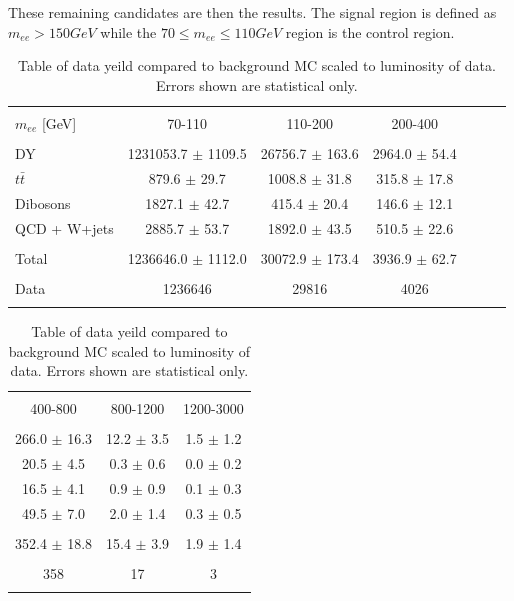 These remaining candidates are then the results. The signal region is defined as $m_{ee} > 150 GeV$ while the $70 \leq m_{ee} \leq 110 GeV$ region is the control region.


\begin{table}[h!]
\centering %
\begin{tabular}{l cccccc} %
\hline\hline \\[-2ex] %
$m_{ee}$ [GeV] & 70-110 & 110-200 & 200-400 \\  [0.2ex]
\hline  \\[-2ex] %
DY & 1231053.7 $\pm$ 1109.5 & 26756.7 $\pm$ 163.6 & 2964.0 $\pm$ 54.4 \\ 
$t\bar{t}$ & 879.6 $\pm$ 29.7 & 1008.8 $\pm$ 31.8 & 315.8 $\pm$ 17.8 \\ 
Dibosons & 1827.1 $\pm$ 42.7 & 415.4 $\pm$ 20.4 & 146.6 $\pm$ 12.1 \\ 
QCD + W+jets & 2885.7 $\pm$ 53.7 & 1892.0 $\pm$ 43.5 & 510.5 $\pm$ 22.6 \\ [0.2ex]
\hline  \\[-2ex] %
Total & 1236646.0 $\pm$ 1112.0 & 30072.9 $\pm$ 173.4 & 3936.9 $\pm$ 62.7 \\ [0.2ex]
\hline  \\[-2ex] %
Data & 1236646 & 29816 & 4026 \\ [0.2ex]
\hline\hline  \\ %
\end{tabular}
\begin{tabular}{ccc} %
\hline\hline \\[-2ex] %
400-800 & 800-1200 & 1200-3000 \\  [0.2ex]
\hline  \\[-2ex] %
266.0 $\pm$ 16.3 & 12.2 $\pm$ 3.5 & 1.5 $\pm$ 1.2 \\ 
20.5 $\pm$ 4.5 & 0.3 $\pm$ 0.6 & 0.0 $\pm$ 0.2 \\ 
16.5 $\pm$ 4.1 & 0.9 $\pm$ 0.9 & 0.1 $\pm$ 0.3 \\ 
49.5 $\pm$ 7.0 & 2.0 $\pm$ 1.4 & 0.3 $\pm$ 0.5 \\ [0.2ex]
\hline  \\[-2ex] %
352.4 $\pm$ 18.8 & 15.4 $\pm$ 3.9 & 1.9 $\pm$ 1.4 \\ [0.2ex]
\hline  \\[-2ex] %
358 & 17 & 3 \\ [0.2ex]
\hline\hline  \\ %
\end{tabular}
\caption{Table of data yeild compared to background MC scaled to luminosity of data. Errors shown are statistical only.} %
\label{tab:dataMCyields}
\end{table}


